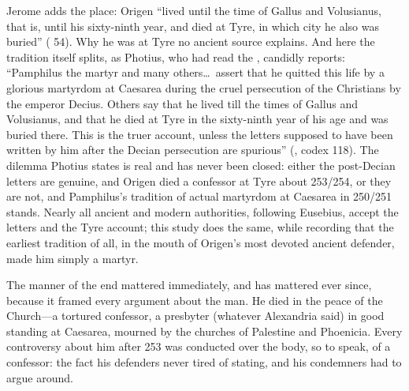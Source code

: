 Jerome adds the place: Origen ``lived until the time of Gallus and
Volusianus, that is, until his sixty-ninth year, and died at Tyre, in which
city he also was buried'' ( 54). Why he was at
Tyre no ancient source explains. And here the tradition itself splits, as
Photius, who had read the , candidly reports:
``Pamphilus the martyr and many others\ldots\ assert that he quitted this
life by a glorious martyrdom at Caesarea during the cruel persecution of
the Christians by the emperor Decius. Others say that he lived till the
times of Gallus and Volusianus, and that he died at Tyre in the sixty-ninth
year of his age and was buried there. This is the truer account, unless
the letters supposed to have been written by him after the Decian
persecution are spurious'' (, codex 118). The dilemma
Photius states is real and has never been closed: either the post-Decian
letters are genuine, and Origen died a confessor at Tyre about 253/254, or
they are not, and Pamphilus's tradition of actual martyrdom at Caesarea in
250/251 stands. Nearly all ancient and modern authorities, following
Eusebius, accept the letters and the Tyre account; this study does the
same, while recording that the earliest tradition of all, in the mouth of
Origen's most devoted ancient defender, made him simply a martyr.


The manner of the end mattered immediately, and has mattered ever since,
because it framed every argument about the man. He died in the peace of the
Church---a tortured confessor, a presbyter (whatever Alexandria said) in
good standing at Caesarea, mourned by the churches of Palestine and
Phoenicia. Every controversy about him after 253 was conducted over the
body, so to speak, of a confessor: the fact his defenders never tired of
stating, and his condemners had to argue around.
